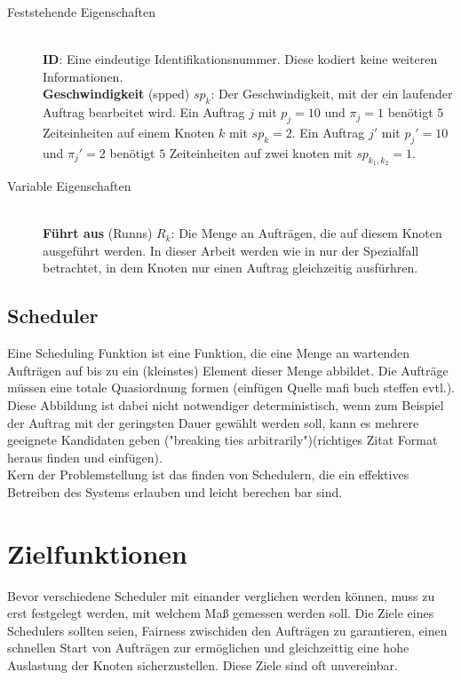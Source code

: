 \begin{description}
	\item[Feststehende Eigenschaften] \hfil \\
	\textbf{ID}: Eine eindeutige Identifikationsnummer. Diese kodiert keine weiteren Informationen.\\
	\textbf{Geschwindigkeit} (spped) $sp_k$: Der Geschwindigkeit, mit der ein laufender Auftrag bearbeitet wird. Ein Auftrag $j$ mit $p_j = 10$ und $\pi_j = 1$ benötigt $5$ Zeiteinheiten auf einem Knoten $k$ mit $sp_k = 2$. Ein Auftrag $j'$ mit $p_j' = 10$ und $\pi_j' = 2$ benötigt $5$ Zeiteinheiten auf zwei knoten mit $sp_{k_1, k_2} = 1$.\\
	\item[Variable Eigenschaften] \hfil \\
	\textbf{Führt aus} (Runns) $R_k$: Die Menge an Aufträgen, die auf diesem Knoten ausgeführt werden. In dieser Arbeit werden wie in \cite{Arn99} nur der Spezialfall betrachtet, in dem Knoten nur einen Auftrag gleichzeitig ausfürhren.\\
\end{description}


\subsection{Scheduler}
Eine Scheduling Funktion ist eine Funktion, die eine Menge an wartenden Aufträgen auf bis zu ein (kleinstes) Element dieser Menge abbildet. Die Aufträge müssen eine totale Quasiordnung formen (einfügen Quelle mafi buch steffen evtl.). Diese Abbildung ist dabei nicht notwendiger deterministisch, wenn zum Beispiel der Auftrag mit der geringsten Dauer gewählt werden soll, kann es mehrere geeignete Kandidaten geben ("breaking ties arbitrarily")(richtiges Zitat Format heraus finden und einfügen)\cite{Kar97}.\\
Kern der Problemstellung ist das finden von Schedulern, die ein effektives Betreiben des Systems erlauben und leicht berechen bar sind.

\section{Zielfunktionen}
Bevor verschiedene Scheduler mit einander verglichen werden können, muss zu erst festgelegt werden, mit welchem Maß gemessen werden soll. Die Ziele eines Schedulers sollten seien, Fairness zwischiden den Aufträgen zu garantieren, einen schnellen Start von Aufträgen zur ermöglichen und gleichzeittig eine hohe Auslastung der Knoten sicherzustellen. Diese Ziele sind oft unvereinbar.


